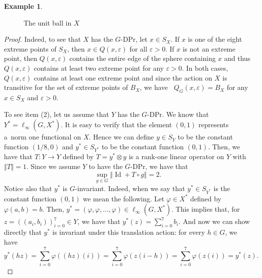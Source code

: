\documentclass[a4paper,12pt]{amsart}
\theoremstyle{definition}
\theoremstyle{definition}
\newtheorem{example}[theorem]{Example}
\theoremstyle{remark}
\numberwithin{equation}{section}
\newcommand{\clco}{\mathop{\overline{\mathrm{co}}}\nolimits}
\DeclareMathOperator{\id}{Id}
\newcommand{\<}{\langle}
\renewcommand{\>}{\rangle}
\newcommand{\norm}[1]{\left\Vert#1\right\Vert}
\newcommand{\e}{\varepsilon}
\newcommand{\eps}{\e}
\begin{document}
\begin{example}
\begin{figure}
			\caption{The unit ball in $X$}
			\label{fig:ballForVecValL1example}
		\end{figure}
	\end{example}
	
	
	\begin{proof}
		Indeed, to see that $X$ has the $G$-DPr, let $x \in S_X$. If $x$ is one of the eight extreme points of $S_X$, then $x \in Q(x, \eps)$ for all $\eps >0$. If $x$ is not an extreme point, then $Q(x,\eps)$ contains the entire edge of the sphere containing $x$ and thus $Q(x, \eps)$ contains at least two extreme point for any $\eps > 0$. In both cases, $Q(x, \eps)$ contains at least one extreme point and since the action on $X$ is transitive for the set of extreme points of $B_X$, we have $\clco Q_G(x, \eps) = B_X$ for any $x \in S_X$ and $\eps > 0$.
		
		
		
		To see item (2), let us assume that $Y$ has the $G$-DPr. We know that $Y^* = \ell_\infty(G, X^*)$. It is easy to verify that the element $(0, 1)$ represents a~norm one functional on $X$. Hence we can define $y \in S_Y$ to be the constant function $(1/8, 0)$ and $y^* \in S_{Y^*}$ to be the constant function $(0,1)$. Then, we have that $T: Y \to Y$ defined by $T = y^* \otimes y$ is a rank-one linear operator on $Y$ with $\norm{T} = 1$.
		Since we assume $Y$ to have the $G$-DPr, we have that
		\begin{equation*}
			\sup_{g \in G} \norm{\id + T \circ g} = 2.
		\end{equation*}
		Notice also that $y^*$ is $G$-invariant. Indeed, when we say that $y^* \in S_{Y^*}$ is the constant function $(0,1)$ we mean the following. Let $\varphi \in X^*$ defined by $\varphi(a,b) = b$. Then, $y^* = (\varphi, \varphi, \ldots, \varphi) \in \ell_{\infty}(G, X^*)$. This implies that, for $z = ((a_i, b_i))_{i=0}^7 \in Y$, we have that $y^*(z) = \sum_{i=0}^7 b_i$. And now we can show directly that $y^*$ is invariant under this translation action: for every $h \in G$, we have
		\begin{equation*}
			y^*(hz) = \sum_{i=0}^7 \varphi((hz)(i)) = \sum_{i=0}^7 \varphi(z(i-h)) = \sum_{i=0}^7 \varphi(z(i)) = y^*(z).
		\end{equation*}    
		

\end{proof}
\end{document}

